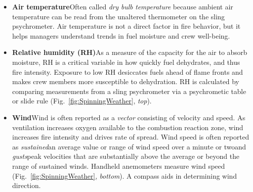 \begin{itemize}%
	\item \textbf{Air temperature\textemdash}Often called \emph{dry bulb temperature} because ambient air temperature can be read from the unaltered thermometer on the sling psychrometer. 
	Air temperature is not a direct factor in fire behavior, but it helps managers understand trends in fuel moisture and crew well-being. 
	\item \textbf{Relative humidity (RH)\textemdash}As a measure of the capacity for the air to absorb moisture, RH is a critical variable in how quickly fuel dehydrates, and thus fire intensity. 
	Exposure to low RH desiccates fuels ahead of flame fronts and makes crew members more susceptible to dehydration. 
	RH is calculated by comparing measurements from a sling psychrometer via a psychrometic table or slide rule (Fig.~\ref{fig:SpinningWeather}, \emph{top}). 
	\item \textbf{Wind\textemdash}Wind is often reported as a \emph{vector} consisting of velocity and speed. 
	As ventilation increases oxygen available to the combustion reaction zone, wind increases fire intensity and drives rate of spread.  
	Wind speed is often reported as \emph{sustained}\textemdash an average value or range of wind speed over a minute or two\textemdash and \emph{gusts}\textemdash peak velocities that are substantially above the average or beyond the range of sustained winds. 
	Handheld anemometers measure wind speed (Fig.~\ref{fig:SpinningWeather}, \emph{bottom}). 
	A compass aids in determining wind direction. 
\end{itemize}

